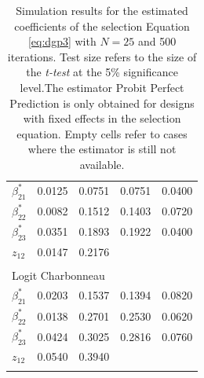 \begin{table}
\begin{tabular}{p{3cm}p{1.8cm}p{1.8cm}p{1.8cm}p{1.8cm}}
    $\beta_{21}^*$ & 0.0125 & 0.0751 & 0.0751 & 0.0400\\
    $\beta_{22}^*$ & 0.0082 & 0.1512 & 0.1403 & 0.0720\\
    $\beta_{23}^*$ & 0.0351 & 0.1893 & 0.1922 & 0.0400\\
     $z_{12}$ & 0.0147 & 0.2176 &  & \\
     & & & & \\
    \hline
    \multicolumn{5}{l}{Logit Charbonneau} \\
    $\beta_{21}^*$ & 0.0203 & 0.1537 & 0.1394 & 0.0820\\
    $\beta_{22}^*$ & 0.0138 & 0.2701 & 0.2530 & 0.0620\\
    $\beta_{23}^*$ & 0.0424 & 0.3025 & 0.2816 & 0.0760\\
    $z_{12}$ & 0.0540 & 0.3940 &  & \\
    & & & & \\
   \hline
\end{tabular}
\caption{\footnotesize{Simulation results for the estimated coefficients of the selection Equation \ref{eq:dgp3} with $N=25$ and 500 iterations. Test size refers to the size of the \textit{t-test} at the 5\% significance level.The estimator Probit Perfect Prediction is only obtained for designs with fixed effects in the selection equation. Empty cells refer to cases where the estimator is still not available.}}
\label{tab:2'}
\end{table}
